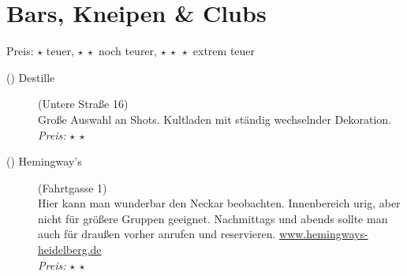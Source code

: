 
\newcommand{\place}[4]{\item[(\stepcounter{zahl}\thezahl) #1](#2)\\ #3\\\emph{Preis:} #4}

\section{Bars, Kneipen \& Clubs}
Preis: $\star$ teuer, $\star\ \star$ noch teurer, $\star\ \star\ \star$ extrem teuer


\begin{description}




    \place{Destille}{Untere Straße 16}{Große Auswahl an Shots. Kultladen mit ständig wechselnder Dekoration.}{$\star\ \star$}




    \place{Hemingway's}{Fahrtgasse 1}{Hier kann man wunderbar den Neckar beobachten. Innenbereich urig, aber nicht für größere Gruppen geeignet. Nachmittags und abends sollte man auch für draußen vorher anrufen und reservieren. \url{www.hemingways-heidelberg.de}}{$\star\ \star$}


\end{description}
